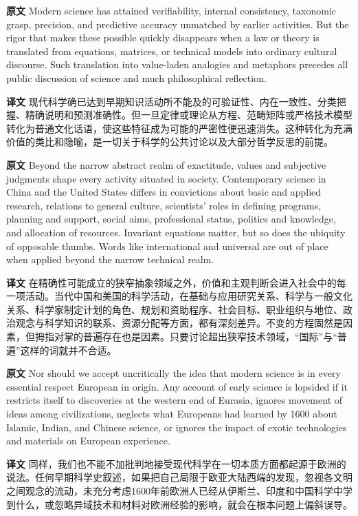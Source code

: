 \documentclass[UTF8,zihao=-4]{ctexart}
\newcommand{\BodyFont}{\fontsize{10.5pt}{15.5pt}\selectfont}
\newcommand{\origlabel}{\textbf{原文}\quad}
\newcommand{\translabel}{\textbf{译文}\quad}
\newenvironment{enblock}{\par\noindent\begingroup\BodyFont\origlabel}{\par\endgroup}
\newenvironment{zhblock}{\par\noindent\begingroup\BodyFont\translabel}{\par\endgroup\vspace{0.35em}}
\begin{document}
\begin{enblock}
Modern science has attained verifiability, internal consistency, taxonomic grasp, precision, and predictive accuracy unmatched by earlier activities. But the rigor that makes these possible quickly disappears when a law or theory is translated from equations, matrices, or technical models into ordinary cultural discourse. Such translation into value-laden analogies and metaphors precedes all public discussion of science and much philosophical reflection.
\end{enblock}
\begin{zhblock}
现代科学确已达到早期知识活动所不能及的可验证性、内在一致性、分类把握、精确说明和预测准确性。但一旦定律或理论从方程、范畴矩阵或严格技术模型转化为普通文化话语，使这些特征成为可能的严密性便迅速消失。这种转化为充满价值的类比和隐喻，是一切关于科学的公共讨论以及大部分哲学反思的前提。
\end{zhblock}

\begin{enblock}
Beyond the narrow abstract realm of exactitude, values and subjective judgments shape every activity situated in society. Contemporary science in China and the United States differs in convictions about basic and applied research, relations to general culture, scientists' roles in defining programs, planning and support, social aims, professional status, politics and knowledge, and allocation of resources. Invariant equations matter, but so does the ubiquity of opposable thumbs. Words like international and universal are out of place when applied beyond the narrow technical realm.
\end{enblock}
\begin{zhblock}
在精确性可能成立的狭窄抽象领域之外，价值和主观判断会进入社会中的每一项活动。当代中国和美国的科学活动，在基础与应用研究关系、科学与一般文化关系、科学家制定计划的角色、规划和资助程序、社会目标、职业组织与地位、政治观念与科学知识的联系、资源分配等方面，都有深刻差异。不变的方程固然是因素，但拇指对掌的普遍存在也是因素。只要讨论超出狭窄技术领域，“国际”与“普遍”这样的词就并不合适。
\end{zhblock}

\begin{enblock}
Nor should we accept uncritically the idea that modern science is in every essential respect European in origin. Any account of early science is lopsided if it restricts itself to discoveries at the western end of Eurasia, ignores movement of ideas among civilizations, neglects what Europeans had learned by 1600 about Islamic, Indian, and Chinese science, or ignores the impact of exotic technologies and materials on European experience.
\end{enblock}
\begin{zhblock}
同样，我们也不能不加批判地接受现代科学在一切本质方面都起源于欧洲的说法。任何早期科学史叙述，如果把自己局限于欧亚大陆西端的发现，忽视各文明之间观念的流动，未充分考虑1600年前欧洲人已经从伊斯兰、印度和中国科学中学到什么，或忽略异域技术和材料对欧洲经验的影响，就会在根本问题上偏斜误导。
\end{zhblock}
\end{document}
